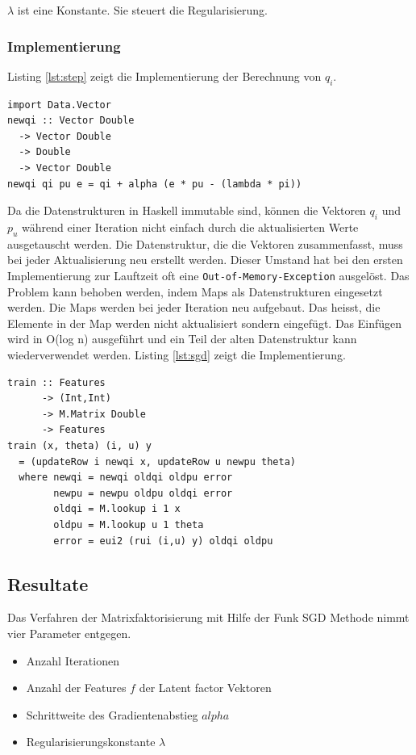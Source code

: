 \documentclass[a4paper, 12pt]{article}
\begin{document}
$\lambda$ ist eine Konstante. Sie steuert die Regularisierung. 

\subsubsection{Implementierung}
\label{sec:sgdimpl}

Listing \ref{lst:step} zeigt die Implementierung der Berechnung von $q_i$.

\begin{lstlisting}[caption=Berechnung von $q_i$, label={lst:step}]
import Data.Vector 
newqi :: Vector Double
  -> Vector Double
  -> Double
  -> Vector Double
newqi qi pu e = qi + alpha (e * pu - (lambda * pi))
\end{lstlisting}

Da die Datenstrukturen in Haskell immutable sind, können die Vektoren $q_i$ und $p_u$ während einer Iteration nicht einfach durch die aktualisierten Werte ausgetauscht werden. Die Datenstruktur, die die Vektoren zusammenfasst, muss bei jeder Aktualisierung neu erstellt werden. Dieser Umstand hat bei den ersten Implementierung zur Lauftzeit oft eine \verb|Out-of-Memory-Exception| ausgelöst. Das Problem kann behoben werden, indem Maps als Datenstrukturen eingesetzt werden. Die Maps werden bei jeder Iteration neu aufgebaut. Das heisst, die Elemente in der Map werden nicht aktualisiert sondern eingefügt. Das Einfügen wird in O(log n) ausgeführt und ein Teil der alten Datenstruktur kann wiederverwendet werden. Listing \ref{lst:sgd} zeigt die Implementierung.

\begin{lstlisting}[caption=Implementierung Funk SGD, label=lst:sgd] 
train :: Features
      -> (Int,Int) 
      -> M.Matrix Double 
      -> Features
train (x, theta) (i, u) y
  = (updateRow i newqi x, updateRow u newpu theta)
  where newqi = newqi oldqi oldpu error
        newpu = newpu oldpu oldqi error
        oldqi = M.lookup i 1 x
        oldpu = M.lookup u 1 theta
        error = eui2 (rui (i,u) y) oldqi oldpu  
\end{lstlisting}

\subsection{Resultate}
\label{sec:matrixfactorresults}

Das Verfahren der Matrixfaktorisierung mit Hilfe der Funk SGD Methode nimmt vier Parameter entgegen.

\begin{itemize}
\item Anzahl Iterationen
\item Anzahl der Features $f$ der Latent factor Vektoren
\item Schrittweite des Gradientenabstieg $alpha$
\item Regularisierungskonstante $\lambda$
\end{itemize}
\end{document}
